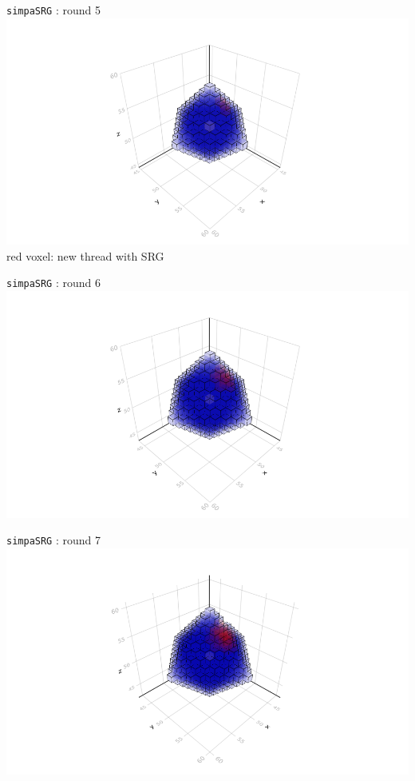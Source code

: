 \documentclass{beamer}
\begin{document}
\begin{frame}{\texttt{simpaSRG} : round 5}
\includegraphics[trim=5cm 0.7cm 5cm 3cm, clip, width=1\linewidth]{algorithm_visualisation/srgthreads2/srg2threads5.png}\\
  red voxel: new thread with SRG 
\end{frame}
\begin{frame}{\texttt{simpaSRG} : round 6}
\includegraphics[trim=5cm 0.7cm 5cm 3cm, clip, width=1\linewidth]{algorithm_visualisation/srgthreads2/srg2threads6.png}\\
\end{frame}
\begin{frame}{\texttt{simpaSRG} : round 7}
\includegraphics[trim=5cm 0.7cm 5cm 3cm, clip, width=1\linewidth]{algorithm_visualisation/srgthreads2/srg2threads7.png}\\
\end{frame}
\end{document}

